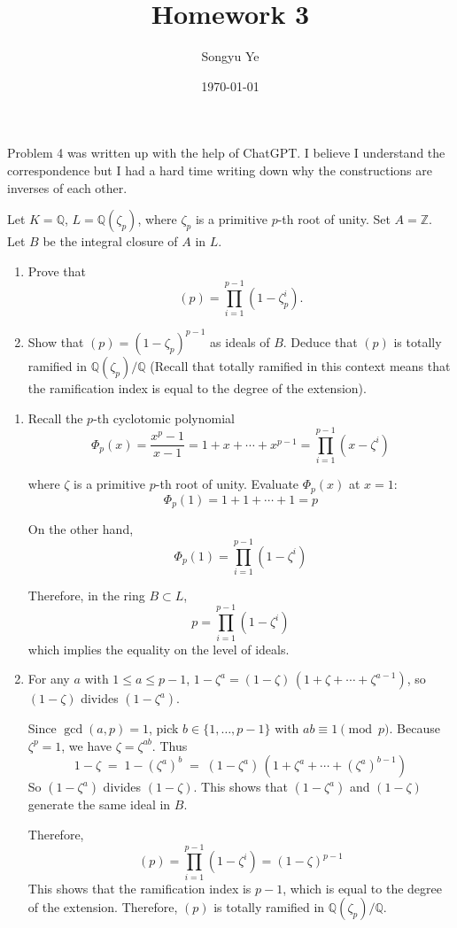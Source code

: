 \documentclass[12pt]{article}  %
\title{Homework 3}
\author{Songyu Ye}
\date{\today}
\begin{document}
\psettitle

Problem 4 was written up with the help of ChatGPT. I believe I understand the correspondence but I had a hard time writing down why the constructions are inverses of each other. 
\begin{problem}{1}
Let $K = \mathbb{Q}$, $L = \mathbb{Q}(\zeta_p)$, where $\zeta_p$ is a primitive $p$-th root of unity.
Set $A = \mathbb{Z}$. Let $B$ be the integral closure of $A$ in $L$.

\begin{enumerate}
    \item Prove that
          \[
              (p) = \prod_{i=1}^{p-1} (1 - \zeta_p^i).
          \]

    \item Show that $(p) = (1 - \zeta_p)^{p-1}$ as ideals of $B$.
          Deduce that $(p)$ is totally ramified in $\mathbb{Q}(\zeta_p)/\mathbb{Q}$ (Recall that totally ramified in this context means that the ramification index is equal to the degree of the extension).
\end{enumerate}
\end{problem}

\begin{solution}
    \begin{enumerate}
        \item Recall the $p$-th cyclotomic polynomial
              \[
                \Phi_p(x)=\frac{x^p-1}{x-1}=1+x+\cdots+x^{p-1}=\prod_{i=1}^{p-1}(x-\zeta^i)
              \]

              where $\zeta$ is a primitive $p$-th root of unity. Evaluate $\Phi_p(x)$ at $x=1$:
              \[
                \Phi_p(1)=1+1+\cdots+1=p
              \]

              On the other hand,
              \[
                \Phi_p(1)=\prod_{i=1}^{p-1}(1-\zeta^i)
              \]

              Therefore, in the ring $B\subset L$,
              \[
                p=\prod_{i=1}^{p-1}(1-\zeta^i)
              \] which implies the equality on the level of ideals.

        \item For any $a$ with $1\le a\le p-1$, $1-\zeta^a=(1-\zeta)\,(1+\zeta+\cdots+\zeta^{a-1})$, so $(1-\zeta)$ divides $(1-\zeta^a)$.

                  Since $\gcd(a,p)=1$, pick $b\in\{1,\dots,p-1\}$ with $ab\equiv1\pmod p$. Because $\zeta^p=1$, we have $\zeta=\zeta^{ab}$. Thus
                  \[1-\zeta \;=\; 1-(\zeta^a)^b \;=\; (1-\zeta^a)\,(1+\zeta^a+\cdots+(\zeta^a)^{b-1})\]
                  So $(1-\zeta^a)$ divides $(1-\zeta)$. This shows that $(1-\zeta^a)$ and $(1-\zeta)$ generate the same ideal in $B$.

                  Therefore,
                      \[
                          (p)=\prod_{i=1}^{p-1}(1-\zeta^i)=(1-\zeta)^{p-1}
                      \]
                      This shows that the ramification index is $p-1$, which is equal to the degree of the extension. Therefore, $(p)$ is totally ramified in $\mathbb{Q}(\zeta_p)/\mathbb{Q}$.
    \end{enumerate}


\end{solution}
\end{document}
